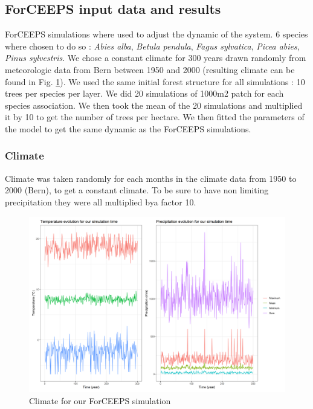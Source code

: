 \documentclass{article}
\begin{document}
\subsection{ForCEEPS input data and results}

ForCEEPS simulations where used to adjust the dynamic of the system. 6 species where chosen to do so : \textit{Abies alba}, \textit{Betula pendula}, \textit{Fagus sylvatica}, \textit{Picea abies}, \textit{Pinus sylvestris}. We chose a constant climate for 300 years drawn randomly from meteorologic data from Bern between 1950 and 2000 (resulting climate can be found in Fig. \ref{fig:climate}). We used the same initial forest structure for all simulations : 10 trees per species per layer. We did 20 simulations of 1000m2 patch for each species association. We then took the mean of the 20 simulations and multiplied it by 10 to get the number of trees per hectare. We then fitted the parameters of the model to get the same dynamic as the ForCEEPS simulations.

\subsubsection{Climate}

Climate was taken randomly for each months in the climate data from 1950 to 2000 (Bern), to get a constant climate. To be sure to have non limiting precipitation they were all multiplied bya factor 10.

\begin{figure}[H]
    \centering
    \includegraphics[width=1\textwidth]{Figure/Parametrisation/Climate_simul.png}
    \caption{Climate for our ForCEEPS simulation}
    \label{fig:climate}
\end{figure}
\end{document}
